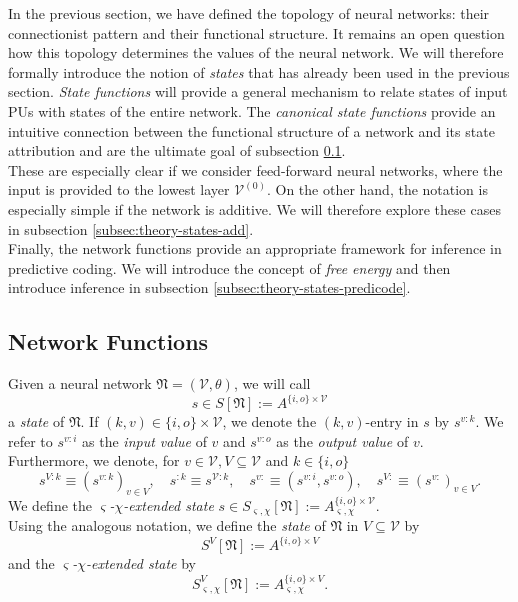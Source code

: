 \documentclass[a4paper,11pt]{report}
\newcommand{\const}{\varsigma} %
\newcommand{\var}{\chi} %
\begin{document}
\begin{Par}
In the previous section, we have defined the topology of neural networks: their connectionist pattern and their functional structure. It remains an open question how this topology determines the values of the neural network. We will therefore formally introduce the notion of \emph{states} that has already been used in the previous section. \emph{State functions} will provide a general mechanism to relate states of input PUs with states of the entire network. The \emph{canonical state functions} provide an intuitive connection between the functional structure of a network and its state attribution and are the ultimate goal of subsection \ref{subsec:theory-states-basics}.\\
These are especially clear if we consider feed-forward neural networks, where the input is provided to the lowest layer $\mathcal{V}^{(0)}$. On the other hand, the notation is especially simple if the network is additive. We will therefore explore these cases in subsection \ref{subsec:theory-states-add}.\\
Finally, the network functions provide an appropriate framework for inference in predictive coding. We will introduce the concept of \emph{free energy} and then introduce inference in subsection \ref{subsec:theory-states-predicode}.
\end{Par}

\subsection{Network Functions}\label{subsec:theory-states-basics}

\begin{Def}[States]
Given a neural network $\mathfrak{N}=(\mathcal{V},\theta)$, we will call
\[
s\in S[\mathfrak{N}]:=A^{\{i,o\}\times\mathcal{V}}
\]
a \emph{state} of $\mathfrak{N}$. If $(k,v)\in\{i,o\}\times\mathcal{V}$, we denote the $(k,v)$-entry in $s$ by $s^{v:k}$. We refer to $s^{v:i}$ as the \emph{input value} of $v$ and $s^{v:o}$ as the \emph{output value} of $v$.\\
Furthermore, we denote, for $v\in\mathcal{V},V\subseteq\mathcal{V}$ and $k\in\{i,o\}$
\[
s^{V:k}\equiv\left(s^{v:k}\right)_{v\in V},
\quad
s^{:k}\equiv s^{\mathcal{V}:k},
\quad
s^{v:}\equiv\left(s^{v:i},s^{v:o}\right),
\quad
s^{V:}\equiv\left(s^{v:}\right)_{v\in V}.
\]
We define the \emph{$\const$-$\var$-extended state} $s\in S_{\const,\var}[\mathfrak{N}]:=A_{\const,\var}^{\{i,o\}\times\mathcal{V}}$.\\
Using the analogous notation, we define the \emph{state} of $\mathfrak{N}$ in $V\subseteq\mathcal{V}$ by 
\[
S^V[\mathfrak{N}]:=A^{\{i,o\}\times V}
\]
and the \emph{$\const$-$\var$-extended state} by
\[
S^V_{\const,\var}[\mathfrak{N}]:=A^{\{i,o\}\times V}_{\const,\var}.
\]
\end{Def}
\end{document}
